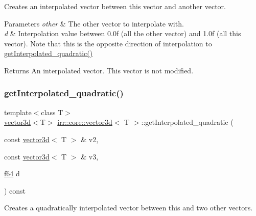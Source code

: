 Creates an interpolated vector between this vector and another vector. 


\begin{DoxyParams}{Parameters}
{\em other} & The other vector to interpolate with. \\
\hline
{\em d} & Interpolation value between 0.\+0f (all the other vector) and 1.\+0f (all this vector). Note that this is the opposite direction of interpolation to \hyperlink{classirr_1_1core_1_1vector3d_aacaa4bbf35d509b1264d1e8e2d48360e}{get\+Interpolated\+\_\+quadratic()} \\
\hline
\end{DoxyParams}
\begin{DoxyReturn}{Returns}
An interpolated vector. This vector is not modified. 
\end{DoxyReturn}
\mbox{\label{classirr_1_1core_1_1vector3d_aacaa4bbf35d509b1264d1e8e2d48360e}} 
\subsubsection{\texorpdfstring{get\+Interpolated\+\_\+quadratic()}{getInterpolated\_quadratic()}}
{\footnotesize\ttfamily template$<$class T$>$ \\
\hyperlink{classirr_1_1core_1_1vector3d}{vector3d}$<$T$>$ \hyperlink{classirr_1_1core_1_1vector3d}{irr\+::core\+::vector3d}$<$ T $>$\+::get\+Interpolated\+\_\+quadratic (\begin{DoxyParamCaption}\item[{const \hyperlink{classirr_1_1core_1_1vector3d}{vector3d}$<$ T $>$ \&}]{v2,  }\item[{const \hyperlink{classirr_1_1core_1_1vector3d}{vector3d}$<$ T $>$ \&}]{v3,  }\item[{\hyperlink{namespaceirr_a1325b02603ad449f92c68fc640af9b28}{f64}}]{d }\end{DoxyParamCaption}) const\hspace{0.3cm}{\ttfamily [inline]}}



Creates a quadratically interpolated vector between this and two other vectors. 


